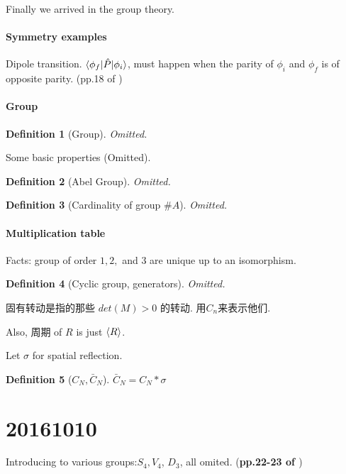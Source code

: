 \documentclass{article}
\numberwithin{equation}{subsection} %
\newtheorem{defi}{Definition}[section]
\theoremstyle{definition}
\begin{document}
Finally we arrived in the group theory.
\paragraph{Symmetry examples} Dipole transition. 
$\braket{\phi_f|\hat{P}|\phi_i}$, must happen when the parity of $\phi_i$
and $\phi_f$ is of opposite parity. (pp.18 of \cite{book})

\paragraph{Group}
\begin{defi}[Group]
    Omitted.
\end{defi}
Some basic properties (Omitted).
\begin{defi}[Abel Group]
    Omitted.
\end{defi}
\begin{defi}[Cardinality of group $\# A$]
    Omitted.
\end{defi}

\paragraph{Multiplication table}

Facts: group of order $1,2,$ and $3$ are unique up to an isomorphism.

\begin{defi}[Cyclic group, generators]
    Omitted.
\end{defi}

\begin{CJK}{UTF8}{gbsn}
固有转动是指的那些 $det(M)>0$ 的转动. 用$C_n$来表示他们.

Also, 周期 of $R$ is just $\braket{R}$.
\end{CJK}

Let $\sigma$ for spatial reflection.
\begin{defi}[$C_N,\bar{C}_N$]
    $\bar{C}_N=C_N*\sigma$
\end{defi}
\section{20161010}
\label{sec:20161010}
Introducing to various groups:$S_4, V_4$, $D_3$, all omited.
(\textbf{pp.22-23 of \cite{book}})
\end{document}
